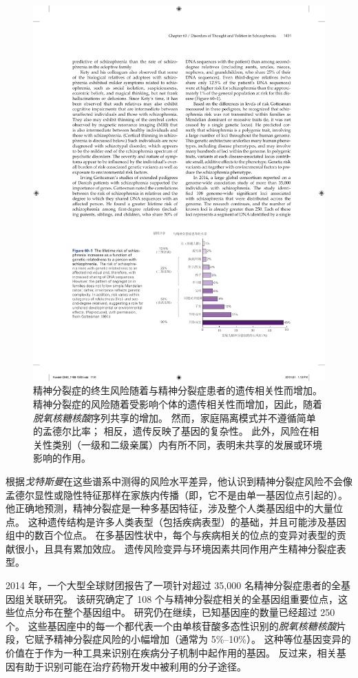 \begin{figure}[htbp]
	\centering
	\includegraphics[width=0.82\linewidth]{chap60/fig_60_1}
	\caption{精神分裂症的终生风险随着与精神分裂症患者的遗传相关性而增加。
		精神分裂症的风险随着受影响个体的遗传相关性而增加，因此，随着\textit{脱氧核糖核酸}序列共享的增加。
		然而，家庭隔离模式并不遵循简单的孟德尔比率；
		相反，遗传反映了基因的复杂性。
		此外，风险在相关性类别（一级和二级亲属）内有所不同，表明未共享的发展或环境影响的作用\cite{gottesman1991schizophrenia}。}
	\label{fig:60_1}
\end{figure}


根据\textit{戈特斯曼}在这些谱系中测得的风险水平差异，他认识到精神分裂症风险不会像孟德尔显性或隐性特征那样在家族内传播（即，它不是由单一基因位点引起的）。
他正确地预测，精神分裂症是一种多基因特征，涉及整个人类基因组中的大量位点。
这种遗传结构是许多人类表型（包括疾病表型）的基础，并且可能涉及基因组中的数百个位点。
在多基因性状中，每个与疾病相关的位点的变异对表型的贡献很小，且具有累加效应。
遗传风险变异与环境因素共同作用产生精神分裂症表型。


2014 年，一个大型全球财团报告了一项针对超过 35,000 名精神分裂症患者的全基因组关联研究。
该研究确定了 108 个与精神分裂症相关的全基因组重要位点，这些位点分布在整个基因组中。
研究仍在继续，已知基因座的数量已经超过 250 个。
这些基因座中的每一个都代表一个由单核苷酸多态性识别的\textit{脱氧核糖核酸}片段，它赋予精神分裂症风险的小幅增加（通常为 5\%–10\%）。
这种等位基因变异的价值在于作为一种工具来识别在疾病分子机制中起作用的基因。
反过来，相关基因有助于识别可能在治疗药物开发中被利用的分子途径。



